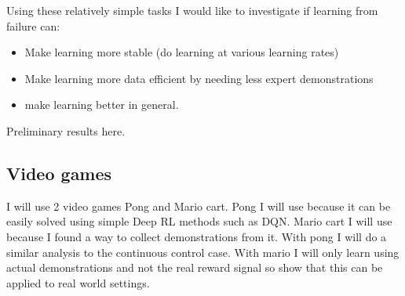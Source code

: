 \documentclass[letterpaper, 10 pt, conference]{ieeeconf}
\begin{document}
Using these relatively simple tasks I would like to investigate if learning from failure can:

\begin{itemize}
 \item Make learning more stable (do learning at various learning rates)
 \item Make learning more data efficient by needing less expert demonstrations
 \item make learning better in general.
\end{itemize}

Preliminary results here.

\subsection{Video games}

I will use 2 video games Pong and Mario cart. Pong I will use because it can be easily solved using simple Deep RL methods such as DQN. Mario cart I will use because I found a way to collect demonstrations from it. With pong I will do a similar analysis to the continuous control case. With mario I will only learn using actual demonstrations and not the real reward signal so show that this can be applied to real world settings. 






















\end{document}
